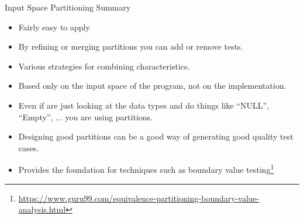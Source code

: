 \documentclass{beamer}
\begin{document}
\begin{frame}{Input Space Partitioning Summary}
  \begin{itemize}
  \item Fairly easy to apply
  \item By refining or merging partitions  you can add or remove
    tests.
  \item Various strategies for combining characteristics.
  \item Based only on the input space of the program, not on the
    implementation.
  \item Even if are just looking at the data types and do things like
    ``NULL'', ``Empty'', $\ldots$ you are using partitions.
  \item Designing good partitions can be a good way of generating good
    quality test cases.
    \item Provides the foundation for techniques such as boundary
      value testing\footnote{\tiny{\url{https://www.guru99.com/equivalence-partitioning-boundary-value-analysis.html}}}
  \end{itemize}

\end{frame}
\end{document}
